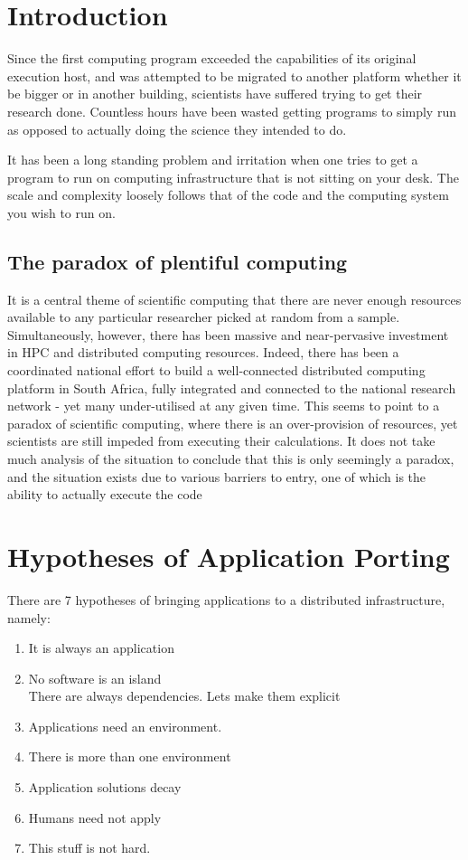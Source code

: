 \documentclass[a4paper]{jpconf}
\begin{document}
\section{Introduction}
Since the first computing program exceeded the capabilities of its original execution host, and was attempted to be migrated to another platform whether it be bigger or
in another building, scientists have suffered trying to get their research done.
Countless hours have been wasted getting programs to simply run as opposed to actually
doing the science they intended to do.

It has been a long standing problem and irritation when one tries to get a program to run on computing infrastructure that is not sitting on your desk. The scale and complexity loosely follows that of the code and the computing system you wish to run on.

\subsection{The paradox of  plentiful computing}

It is a central theme of scientific computing that there are never enough resources available to any particular researcher picked at random from a sample. Simultaneously, however, there has been massive and near-pervasive investment in HPC and distributed computing resources. Indeed, there has been a coordinated national effort to build a well-connected distributed computing platform in South Africa\cite{SAGrid}, fully integrated and connected to the national research network\cite{_sanren_????} - yet many  under-utilised at any given time. This seems to point to a paradox of scientific computing, where there is an over-provision of resources, yet scientists are still impeded from executing their calculations. It does not take much analysis of the situation to conclude that this is only seemingly a paradox, and the situation exists due to various barriers to entry, one of which is the ability to actually execute the code


\section{Hypotheses of Application Porting}

There are 7 hypotheses of bringing applications to a distributed infrastructure, namely:
\begin{enumerate}
    \item It is always an application
    \item No software is an island\\
      There are always dependencies. Lets make them explicit
    \item Applications need an environment.\\
    \item There is more than one environment
    \item Application solutions decay
    \item Humans need not apply
    \item This stuff is not hard.
  \end{enumerate}
\end{document}
